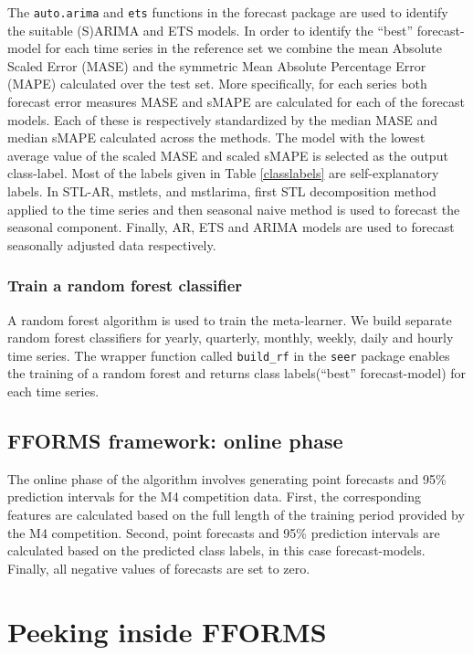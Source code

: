 \documentclass[11pt,a4paper,]{article}
\begin{document}
The \texttt{auto.arima} and \texttt{ets} functions in the forecast
package are used to identify the suitable (S)ARIMA and ETS models. In
order to identify the ``best'' forecast-model for each time series in
the reference set we combine the mean Absolute Scaled Error (MASE) and
the symmetric Mean Absolute Percentage Error (MAPE) calculated over the
test set. More specifically, for each series both forecast error
measures MASE and sMAPE are calculated for each of the forecast models.
Each of these is respectively standardized by the median MASE and median
sMAPE calculated across the methods. The model with the lowest average
value of the scaled MASE and scaled sMAPE is selected as the output
class-label. Most of the labels given in Table \ref{classlabels} are
self-explanatory labels. In STL-AR, mstlets, and mstlarima, first STL
decomposition method applied to the time series and then seasonal naive
method is used to forecast the seasonal component. Finally, AR, ETS and
ARIMA models are used to forecast seasonally adjusted data respectively.

\subsubsection{Train a random forest
classifier}\label{train-a-random-forest-classifier}

A random forest algorithm is used to train the meta-learner. We build
separate random forest classifiers for yearly, quarterly, monthly,
weekly, daily and hourly time series. The wrapper function called
\texttt{build\_rf} in the \texttt{seer} package enables the training of
a random forest and returns class labels(``best'' forecast-model) for
each time series.

\subsection{FFORMS framework: online
phase}\label{fforms-framework-online-phase}

The online phase of the algorithm involves generating point forecasts
and 95\% prediction intervals for the M4 competition data. First, the
corresponding features are calculated based on the full length of the
training period provided by the M4 competition. Second, point forecasts
and 95\% prediction intervals are calculated based on the predicted
class labels, in this case forecast-models. Finally, all negative values
of forecasts are set to zero.

\section{Peeking inside FFORMS}\label{machinelearning}
\end{document}
